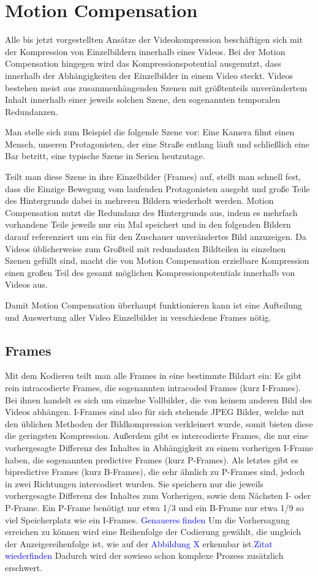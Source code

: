 \section{Motion Compensation}

Alle bis jetzt vorgestellten Ansätze der Videokompression beschäftigen sich mit der Kompression von Einzelbildern innerhalb eines Videos. Bei der Motion Compensation hingegen wird das Kompressionspotential ausgenutzt, dass innerhalb der Abhängigkeiten der Einzelbilder in einem Video steckt.
Videos bestehen meist aus zusammenhängenden Szenen mit größtenteils unverändertem Inhalt innerhalb einer jeweils solchen Szene, den sogenannten temporalen Redundanzen.

Man stelle sich zum Beispiel die folgende Szene vor: Eine Kamera filmt einen Mensch, unseren Protagonisten, der eine Straße entlang läuft und schließlich eine Bar betritt, eine typische Szene in Serien heutzutage.

Teilt man diese Szene in ihre Einzelbilder (Frames) auf, stellt man schnell fest, dass die Einzige Bewegung vom laufenden Protagonisten ausgeht und große Teile des Hintergrunds dabei in mehreren Bildern wiederholt werden.
Motion Compensation nutzt die Redundanz des Hintergrunds aus, indem es mehrfach vorhandene Teile jeweils nur ein Mal speichert und in den folgenden Bildern darauf referenziert um ein für den Zuschauer unverändertes Bild anzuzeigen.
Da Videos üblicherweise zum Großteil mit redundanten Bildteilen in einzelnen Szenen gefüllt sind, macht die von Motion Compensation erzielbare Kompression einen großen Teil des gesamt möglichen Kompressionpotentials innerhalb von Videos aus.

Damit Motion Compensation überhaupt funktionieren kann ist eine Aufteilung und Auswertung aller Video Einzelbilder in verschiedene Frames nötig.
\subsection{Frames}
Mit dem Kodieren teilt man alle Frames in eine bestimmte Bildart ein:
Es gibt rein intracodierte Frames, die sogenannten intracoded Frames (kurz I-Frames). Bei ihnen handelt es sich um einzelne Vollbilder, die von keinem anderen Bild des Videos abhängen. I-Frames sind also für sich stehende JPEG Bilder, welche mit den üblichen Methoden der Bildkompression verkleinert wurde, somit bieten diese die geringsten Kompression.
Außerdem gibt es intercodierte Frames, die nur eine vorhergesagte Differenz des Inhaltes in Abhängigkeit zu einem vorherigen I-Frame haben, die sogenannten predictive Frames (kurz P-Frames).
Als letztes gibt es bipredictive Frames (kurz B-Frames), die sehr ähnlich zu P-Frames sind, jedoch in zwei Richtungen intercodiert wurden. Sie speichern nur die jeweils vorhergesagte Differenz des Inhaltes zum Vorherigen, sowie dem Nächsten I- oder P-Frame.
Ein P-Frame benötigt nur etwa 1/3 und ein B-Frame nur etwa 1/9 so viel Speicherplatz wie ein I-Frames. \textcolor{blue}{Genaueres finden}
Um die Vorhersagung erreichen zu können wird eine Reihenfolge der Codierung gewählt, die ungleich der Anzeigereihenfolge ist, wie auf der \textcolor{blue}{Abbildung X} erkennbar ist.\textcolor{blue}{Zitat wiederfinden} Dadurch wird der sowieso schon komplexe Prozess zusätzlich erschwert.

